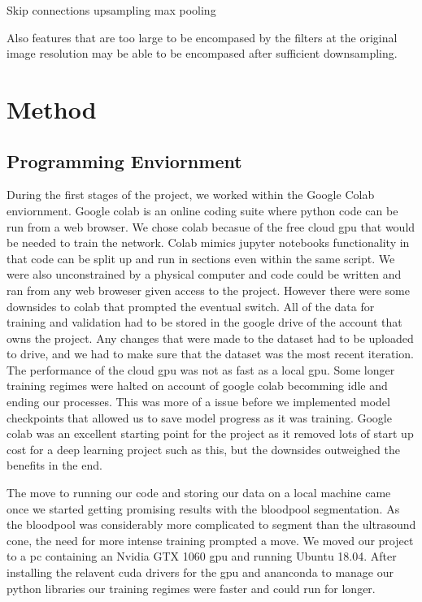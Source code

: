 \documentclass[12pt]{article}
\begin{document}
Skip connections
upsampling
max pooling

Also features that are too large to be encompased by the filters at the original image resolution may be able to be encompased after sufficient downsampling.

\section{Method}
\subsection{Programming Enviornment}
During the first stages of the project, we worked within the Google Colab enviornment.
Google colab is an online coding suite where python code can be run from a web browser.
We chose colab becasue of the free cloud gpu that would be needed to train the network.
Colab mimics jupyter notebooks functionality in that code can be split up and run in sections even within the same script.
We were also unconstrained by a physical computer and code could be written and ran from any web broweser given access to the project.
However there were some downsides to colab that prompted the eventual switch.
All of the data for training and validation had to be stored in the google drive of the account that owns the project.
Any changes that were made to the dataset had to be uploaded to drive, and we had to make sure that the dataset was the most recent iteration.
The performance of the cloud gpu was not as fast as a local gpu.
Some longer training regimes were halted on account of google colab becomming idle and ending our processes.
This was more of a issue before we implemented model checkpoints that allowed us to save model progress as it was training.
Google colab was an excellent starting point for the project as it removed lots of start up cost for a deep learning project such as this, but the downsides outweighed the benefits in the end.

The move to running our code and storing our data on a local machine came once we started getting promising results with the bloodpool segmentation.
As the bloodpool was considerably more complicated to segment than the ultrasound cone, the need for more intense training prompted a move.
We moved our project to a pc containing an Nvidia GTX 1060 gpu and running Ubuntu 18.04.
After installing the relavent cuda drivers for the gpu and ananconda to manage our python libraries our training regimes were faster and could run for longer.
\end{document}
